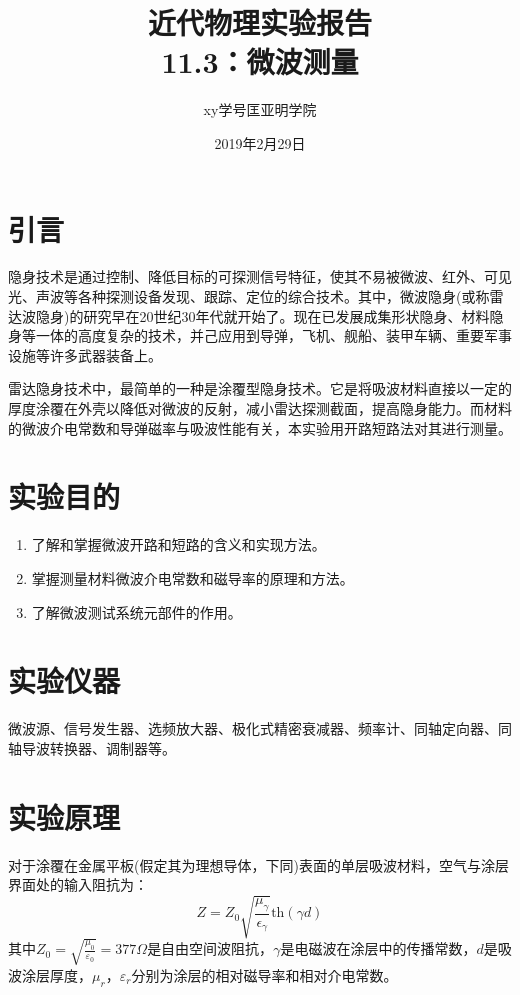 \documentclass[a4paper]{article}
\title{\Huge 近代物理实验报告\\\huge 11.3：微波测量}
\author{xy\quad 学号\quad 匡亚明学院}
\date{2019年2月29日}
\begin{document}
\maketitle

\def\th{\text{th}}
\def\e{\text{e}}


\section{引言}
隐身技术是通过控制、降低目标的可探测信号特征，使其不易被微波、红外、可见光、声波等各种探测设备发现、跟踪、定位的综合技术。其中，微波隐身(或称雷达波隐身)的研究早在20世纪30年代就开始了。现在已发展成集形状隐身、材料隐身等一体的高度复杂的技术，并己应用到导弹，飞机、舰船、装甲车辆、重要军事设施等许多武器装备上。

雷达隐身技术中，最简单的一种是涂覆型隐身技术。它是将吸波材料直接以一定的厚度涂覆在外壳以降低对微波的反射，减小雷达探测截面，提高隐身能力。而材料的微波介电常数和导弹磁率与吸波性能有关，本实验用开路短路法对其进行测量。

\section{实验目的}
\begin{enumerate}
	\item 了解和掌握微波开路和短路的含义和实现方法。
	\item 掌握测量材料微波介电常数和磁导率的原理和方法。
	\item 了解微波测试系统元部件的作用。
\end{enumerate}

\section{实验仪器}
微波源、信号发生器、选频放大器、极化式精密衰减器、频率计、同轴定向器、同轴导波转换器、调制器等。

\section{实验原理}
对于涂覆在金属平板(假定其为理想导体，下同)表面的单层吸波材料，空气与涂层界面处的输入阻抗为：
\begin{equation}
	Z=Z_0\sqrt{\frac{\mu_\gamma}{\epsilon_\gamma}}\text{th}(\gamma d)\label{eq1}
\end{equation}
其中$Z_0 = \sqrt{\frac{\mu_0}{\varepsilon_0}} = 377\Omega$是自由空间波阻抗，$\gamma$是电磁波在涂层中的传播常数，$d$是吸波涂层厚度，$\mu_r$，$\varepsilon_r$分别为涂层的相对磁导率和相对介电常数。
\end{document}
